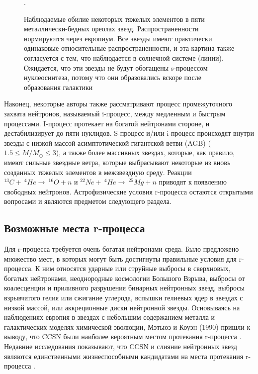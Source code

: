 \documentclass[%
master,    %
natbib,      %
subf,        %
href,        %
colorlinks,  %
]{disser}
\begin{document}
\begin{figure}[h]
	\caption{Наблюдаемые обилие некоторых тяжелых элементов в пяти металлически-бедных ореолах  звезд. Распространенности нормируются через европиум. Все звезды имеют практически одинаковые относительные распространенности, и эта картина также согласуется с тем, что наблюдается в солнечной системе (линии). Ожидается, что эти звезды не будут обогащены s-процессом нуклеосинтеза, потому что они образовались вскоре после образования галактики  \cite{new-abu}}.
	\label{ris:8}
\end{figure}

Наконец, некоторые авторы также рассматривают процесс промежуточного захвата нейтронов, называемый i-процесс, между медленным и быстрым процессами. I-процесс протекает на богатой нейтронами стороне, и дестабилизирует до пяти нуклидов. S-процесс и/или i-процесс происходят внутри звезды с низкой массой асимптотической гигантской ветви (AGB) ($1.5 \le M/M_\odot \le 3$), а также более массивных звездах, которые, как правило, имеют сильные звездные ветра, которые выбрасывают некоторые из вновь созданных тяжелых элементов в межзвездную среду. Реакции $^{13}C + \ ^4He \to \ ^{16}O + n$ и $^{22}Ne + \ ^4He \to \ ^{25}Mg + n$ приводят к появлению свободных нейтронов. Астрофизические условия r-процесса остаются открытыми вопросами и являются предметом следующего раздела.

\subsection{Возможные места r-процесса}

Для r-процесса требуется очень богатая нейтронами среда. Было предложено множество мест, в которых могут быть достигнуты правильные условия для r-процесса. К ним относятся ударные или струйные выбросы в сверхновых, богатых нейтронами, неоднородные космологии Большого Взрыва, выбросы от коалесценции и приливного разрушения бинарных нейтронных звезд, выбросы взрывчатого гелия или сжигание углерода, вспышки гелиевых ядер в звездах с низкой массой, или аккреционные диски нейтронной звезды. Основываясь на наблюдениях европия в звездах с небольшим содержанием металла и галактических моделях химической эволюции, Мэтьюз и Коуэн (1990) пришли к выводу, что CCSN были наиболее вероятным местом протекания r-процесса \cite{places}. Недавние исследования показывают, что CCSN и слияние нейтронных звезд являются единственными жизнеспособными кандидатами на места протекания r-процесса \cite{sites}.
\end{document}
